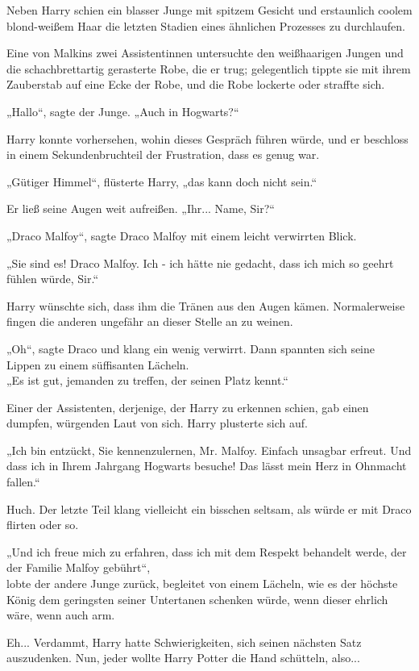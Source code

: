 {Neben Harry schien ein blasser Junge mit spitzem Gesicht und erstaunlich coolem blond-weißem Haar die letzten Stadien eines ähnlichen Prozesses zu durchlaufen.

Eine von Malkins zwei Assistentinnen untersuchte den weißhaarigen Jungen und die schachbrettartig gerasterte Robe, die er trug; gelegentlich tippte sie mit ihrem Zauberstab auf eine Ecke der Robe, und die Robe lockerte oder straffte sich.

„Hallo“, sagte der Junge. „Auch in Hogwarts?“

Harry konnte vorhersehen, wohin dieses Gespräch führen würde, und er beschloss in einem Sekundenbruchteil der Frustration, dass es genug war.

„Gütiger Himmel“, flüsterte Harry, „das kann doch nicht sein.“

Er ließ seine Augen weit aufreißen. „Ihr... Name, Sir?“

„Draco Malfoy“, sagte Draco Malfoy mit einem leicht verwirrten Blick.

„Sie sind es! Draco Malfoy. Ich - ich hätte nie gedacht, dass ich mich so geehrt fühlen würde, Sir.“

Harry wünschte sich, dass ihm die Tränen aus den Augen kämen. Normalerweise fingen die anderen ungefähr an dieser Stelle an zu weinen.

„Oh“, sagte Draco und klang ein wenig verwirrt. Dann spannten sich seine Lippen zu einem süffisanten Lächeln.\\ „Es ist gut, jemanden zu treffen, der seinen Platz kennt.“

Einer der Assistenten, derjenige, der Harry zu erkennen schien, gab einen dumpfen, würgenden Laut von sich. Harry plusterte sich auf.

„Ich bin entzückt, Sie kennenzulernen, Mr. Malfoy. Einfach unsagbar erfreut. Und dass ich in Ihrem Jahrgang Hogwarts besuche! Das lässt mein Herz in Ohnmacht fallen.“

Huch. Der letzte Teil klang vielleicht ein bisschen seltsam, als würde er mit Draco flirten oder so.

„Und ich freue mich zu erfahren, dass ich mit dem Respekt behandelt werde, der der Familie Malfoy gebührt“,\\ lobte der andere Junge zurück, begleitet von einem Lächeln, wie es der höchste König dem geringsten seiner Untertanen schenken würde, wenn dieser ehrlich wäre, wenn auch arm.

Eh... Verdammt, Harry hatte Schwierigkeiten, sich seinen nächsten Satz auszudenken. Nun, jeder wollte Harry Potter die Hand schütteln, also...

}
